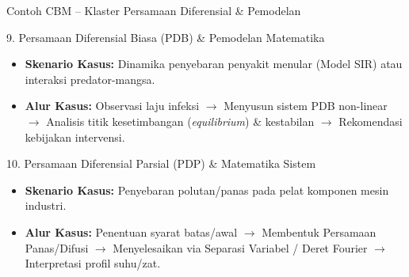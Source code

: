 \documentclass[aspectratio=169]{beamer} %
\begin{document}
\begin{frame}{Contoh CBM – Klaster Persamaan Diferensial \& Pemodelan}
    \begin{block}{9. Persamaan Diferensial Biasa (PDB) \& Pemodelan Matematika}
        \begin{itemize}
            \item \textbf{Skenario Kasus:} Dinamika penyebaran penyakit menular (Model SIR) atau interaksi predator-mangsa.
            \item \textbf{Alur Kasus:} Observasi laju infeksi $\rightarrow$ Menyusun sistem PDB non-linear $\rightarrow$ Analisis titik kesetimbangan (\textit{equilibrium}) \& kestabilan $\rightarrow$ Rekomendasi kebijakan intervensi.
        \end{itemize}
    \end{block}

    \begin{block}{10. Persamaan Diferensial Parsial (PDP) \& Matematika Sistem}
        \begin{itemize}
            \item \textbf{Skenario Kasus:} Penyebaran polutan/panas pada pelat komponen mesin industri.
            \item \textbf{Alur Kasus:} Penentuan syarat batas/awal $\rightarrow$ Membentuk Persamaan Panas/Difusi $\rightarrow$ Menyelesaikan via Separasi Variabel / Deret Fourier $\rightarrow$ Interpretasi profil suhu/zat.
        \end{itemize}
    \end{block}
\end{frame}
\end{document}
